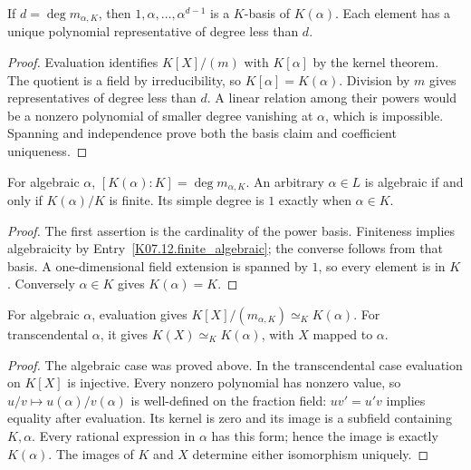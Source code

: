 \begin{theorem}
If $d=\deg m_{\alpha,K}$, then $1,\alpha,\ldots,\alpha^{d-1}$ is a $K$-basis of $K(\alpha)$. Each element has a unique polynomial representative of degree less than $d$.
\end{theorem}
\begin{proof}
Evaluation identifies $K[X]/(m)$ with $K[\alpha]$ by the kernel theorem. The quotient is a field by irreducibility, so $K[\alpha]=K(\alpha)$. Division by $m$ gives representatives of degree less than $d$. A linear relation among their powers would be a nonzero polynomial of smaller degree vanishing at $\alpha$, which is impossible. Spanning and independence prove both the basis claim and coefficient uniqueness.
\end{proof}

\begin{corollary}
For algebraic $\alpha$, $[K(\alpha):K]=\deg m_{\alpha,K}$. An arbitrary $\alpha\in L$ is algebraic if and only if $K(\alpha)/K$ is finite. Its simple degree is $1$ exactly when $\alpha\in K$.
\end{corollary}
\begin{proof}
The first assertion is the cardinality of the power basis. Finiteness implies algebraicity by Entry~\ref{K07.12.finite_algebraic}; the converse follows from that basis. A one-dimensional field extension is spanned by $1$, so every element is in $K$. Conversely $\alpha\in K$ gives $K(\alpha)=K$.
\end{proof}

\begin{theorem}
For algebraic $\alpha$, evaluation gives $K[X]/(m_{\alpha,K})\simeq_K K(\alpha)$. For transcendental $\alpha$, it gives $K(X)\simeq_K K(\alpha)$, with $X$ mapped to $\alpha$.
\end{theorem}
\begin{proof}
The algebraic case was proved above. In the transcendental case evaluation on $K[X]$ is injective. Every nonzero polynomial has nonzero value, so $u/v\mapsto u(\alpha)/v(\alpha)$ is well-defined on the fraction field: $uv'=u'v$ implies equality after evaluation. Its kernel is zero and its image is a subfield containing $K,\alpha$. Every rational expression in $\alpha$ has this form; hence the image is exactly $K(\alpha)$. The images of $K$ and $X$ determine either isomorphism uniquely.
\end{proof}

